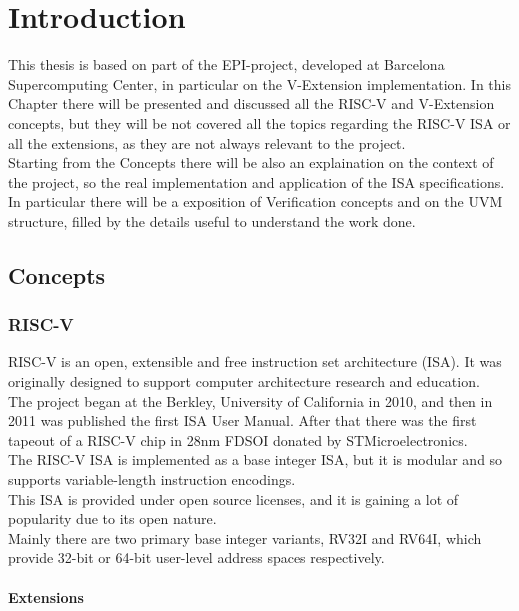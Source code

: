 \chapter{Introduction}
This thesis is based on part of the EPI-project, developed at Barcelona Supercomputing Center, in particular on the V-Extension implementation.
In this Chapter there will be presented and discussed all the RISC-V and V-Extension concepts, but they will be not covered all the topics regarding the RISC-V ISA or all the extensions, as they are not always relevant to the project.\\
Starting from the Concepts there will be also an explaination on the context of the project, so the real implementation and application of the ISA specifications.
In particular there will be a exposition of Verification concepts and on the UVM structure, filled by the details useful to understand the work done.



\section{Concepts}
\subsection{RISC-V}
RISC-V is an open, extensible and free instruction set architecture (ISA). It was originally designed to support computer architecture research and education\cite{RISC-V-Instruction-Set-Manual}.\\
The project began at the Berkley, University of California in 2010, and then in 2011 was published the first ISA User Manual. After that there was the first tapeout of a RISC-V chip in 28nm FDSOI donated by STMicroelectronics.\\

The RISC-V ISA is implemented as a base integer ISA, but it is modular and so supports  variable-length instruction encodings.\\
This ISA is provided under open source licenses, and it is gaining a lot of popularity due to its open nature. \\
Mainly there are two primary base integer variants, RV32I and RV64I, which provide 32-bit or 64-bit user-level address spaces respectively.\\

\subsubsection{Extensions}

